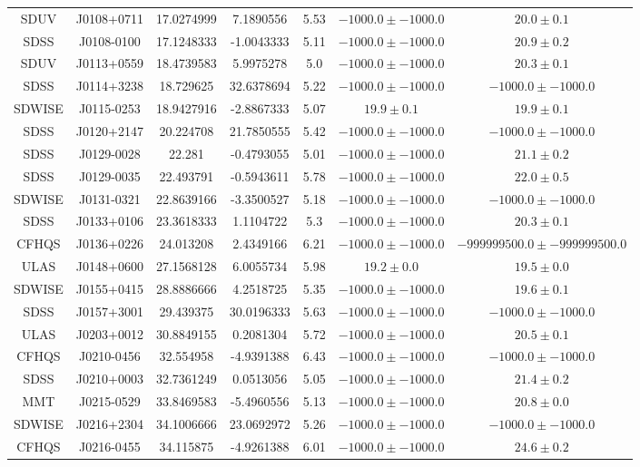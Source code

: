 \begin{table}
\begin{tabular}{ccccccc}
SDUV & J0108+0711 & 17.0274999 & 7.1890556 & 5.53 & $-1000.0\pm-1000.0$ & $  20.0\pm  0.1$ \\
SDSS & J0108-0100 & 17.1248333 & -1.0043333 & 5.11 & $-1000.0\pm-1000.0$ & $  20.9\pm  0.2$ \\
SDUV & J0113+0559 & 18.4739583 & 5.9975278 & 5.0 & $-1000.0\pm-1000.0$ & $  20.3\pm  0.1$ \\
SDSS & J0114+3238 & 18.729625 & 32.6378694 & 5.22 & $-1000.0\pm-1000.0$ & $-1000.0\pm-1000.0$ \\
SDWISE & J0115-0253 & 18.9427916 & -2.8867333 & 5.07 & $  19.9\pm  0.1$ & $  19.9\pm  0.1$ \\
SDSS & J0120+2147 & 20.224708 & 21.7850555 & 5.42 & $-1000.0\pm-1000.0$ & $-1000.0\pm-1000.0$ \\
SDSS & J0129-0028 & 22.281 & -0.4793055 & 5.01 & $-1000.0\pm-1000.0$ & $  21.1\pm  0.2$ \\
SDSS & J0129-0035 & 22.493791 & -0.5943611 & 5.78 & $-1000.0\pm-1000.0$ & $  22.0\pm  0.5$ \\
SDWISE & J0131-0321 & 22.8639166 & -3.3500527 & 5.18 & $-1000.0\pm-1000.0$ & $-1000.0\pm-1000.0$ \\
SDSS & J0133+0106 & 23.3618333 & 1.1104722 & 5.3 & $-1000.0\pm-1000.0$ & $  20.3\pm  0.1$ \\
CFHQS & J0136+0226 & 24.013208 & 2.4349166 & 6.21 & $-1000.0\pm-1000.0$ & $-999999500.0\pm-999999500.0$ \\
ULAS & J0148+0600 & 27.1568128 & 6.0055734 & 5.98 & $  19.2\pm  0.0$ & $  19.5\pm  0.0$ \\
SDWISE & J0155+0415 & 28.8886666 & 4.2518725 & 5.35 & $-1000.0\pm-1000.0$ & $  19.6\pm  0.1$ \\
SDSS & J0157+3001 & 29.439375 & 30.0196333 & 5.63 & $-1000.0\pm-1000.0$ & $-1000.0\pm-1000.0$ \\
ULAS & J0203+0012 & 30.8849155 & 0.2081304 & 5.72 & $-1000.0\pm-1000.0$ & $  20.5\pm  0.1$ \\
CFHQS & J0210-0456 & 32.554958 & -4.9391388 & 6.43 & $-1000.0\pm-1000.0$ & $-1000.0\pm-1000.0$ \\
SDSS & J0210+0003 & 32.7361249 & 0.0513056 & 5.05 & $-1000.0\pm-1000.0$ & $  21.4\pm  0.2$ \\
MMT & J0215-0529 & 33.8469583 & -5.4960556 & 5.13 & $-1000.0\pm-1000.0$ & $  20.8\pm  0.0$ \\
SDWISE & J0216+2304 & 34.1006666 & 23.0692972 & 5.26 & $-1000.0\pm-1000.0$ & $-1000.0\pm-1000.0$ \\
CFHQS & J0216-0455 & 34.115875 & -4.9261388 & 6.01 & $-1000.0\pm-1000.0$ & $  24.6\pm  0.2$ \\

\end{tabular}
\end{table}
